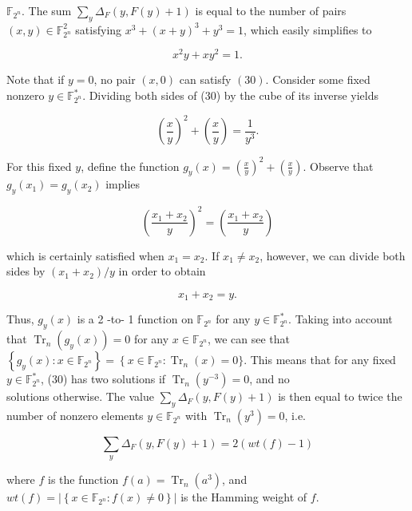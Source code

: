 \documentclass[10pt]{article}
\begin{document}
$\mathbb{F}_{2^{n}}$. The sum $\sum_{y} \Delta_{F}(y, F(y)+1)$ is equal to the number of pairs $(x, y) \in \mathbb{F}_{2^{n}}^{2}$ satisfying $x^{3}+(x+y)^{3}+y^{3}=1$, which easily simplifies to


\begin{equation*}
x^{2} y+x y^{2}=1 . \tag{30}
\end{equation*}


Note that if $y=0$, no pair $(x, 0)$ can satisfy $(30)$. Consider some fixed nonzero $y \in \mathbb{F}_{2^{n}}^{*}$. Dividing both sides of (30) by the cube of its inverse yields


\begin{equation*}
\left(\frac{x}{y}\right)^{2}+\left(\frac{x}{y}\right)=\frac{1}{y^{3}} . \tag{31}
\end{equation*}


For this fixed $y$, define the function $g_{y}(x)=\left(\frac{x}{y}\right)^{2}+\left(\frac{x}{y}\right)$. Observe that $g_{y}\left(x_{1}\right)=g_{y}\left(x_{2}\right)$ implies

$$
\left(\frac{x_{1}+x_{2}}{y}\right)^{2}=\left(\frac{x_{1}+x_{2}}{y}\right)
$$

which is certainly satisfied when $x_{1}=x_{2}$. If $x_{1} \neq x_{2}$, however, we can divide both sides by $\left(x_{1}+x_{2}\right) / y$ in order to obtain


\begin{equation*}
x_{1}+x_{2}=y . \tag{32}
\end{equation*}


Thus, $g_{y}(x)$ is a 2 -to- 1 function on $\mathbb{F}_{2^{n}}$ for any $y \in \mathbb{F}_{2^{n}}^{*}$. Taking into account that $\operatorname{Tr}_{n}\left(g_{y}(x)\right)=0$ for any $x \in \mathbb{F}_{2^{n}}$, we can see that $\left\{g_{y}(x): x \in \mathbb{F}_{2^{n}}\right\}=\left\{x \in \mathbb{F}_{2^{n}}: \operatorname{Tr}_{n}(x)=\right. 0\}$. This means that for any fixed $y \in \mathbb{F}_{2^{n}}^{*}$, (30) has two solutions if $\operatorname{Tr}_{n}\left(y^{-3}\right)=0$, and no\\
solutions otherwise. The value $\sum_{y} \Delta_{F}(y, F(y)+1)$ is then equal to twice the number of nonzero elements $y \in \mathbb{F}_{2^{n}}$ with $\operatorname{Tr}_{n}\left(y^{3}\right)=0$, i.e.


\begin{equation*}
\sum_{y} \Delta_{F}(y, F(y)+1)=2(w t(f)-1) \tag{33}
\end{equation*}


where $f$ is the function $f(a)=\operatorname{Tr}_{n}\left(a^{3}\right)$, and $w t(f)=\left|\left\{x \in \mathbb{F}_{2^{n}}: f(x) \neq 0\right\}\right|$ is the Hamming weight of $f$.
\end{document}
